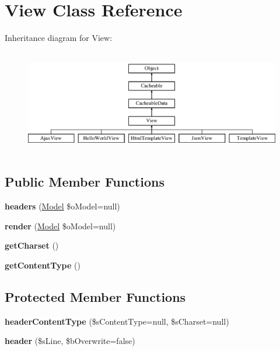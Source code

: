 \hypertarget{class_view}{\section{View Class Reference}
\label{class_view}
}
Inheritance diagram for View\-:\begin{figure}[H]
\begin{center}
\leavevmode
\includegraphics[height=4.590164cm]{class_view}
\end{center}
\end{figure}
\subsection*{Public Member Functions}
\begin{DoxyCompactItemize}
\item 
\hypertarget{class_view_aaa3234016633650917fc337f8becf604}{{\bfseries headers} (\hyperlink{class_model}{Model} \$o\-Model=null)}\label{class_view_aaa3234016633650917fc337f8becf604}

\item 
\hypertarget{class_view_a0d4ea80258b22d65d7438bbe3bd83b73}{{\bfseries render} (\hyperlink{class_model}{Model} \$o\-Model=null)}\label{class_view_a0d4ea80258b22d65d7438bbe3bd83b73}

\item 
\hypertarget{class_view_a2caf1723e7cd9863eaa22a4b3ef2efe3}{{\bfseries get\-Charset} ()}\label{class_view_a2caf1723e7cd9863eaa22a4b3ef2efe3}

\item 
\hypertarget{class_view_ab3d90dd36d7c939b697a3dcf1961ca5c}{{\bfseries get\-Content\-Type} ()}\label{class_view_ab3d90dd36d7c939b697a3dcf1961ca5c}

\end{DoxyCompactItemize}
\subsection*{Protected Member Functions}
\begin{DoxyCompactItemize}
\item 
\hypertarget{class_view_ad7926cf5f6627abdb4eced89b6b113ce}{{\bfseries header\-Content\-Type} (\$s\-Content\-Type=null, \$s\-Charset=null)}\label{class_view_ad7926cf5f6627abdb4eced89b6b113ce}

\item 
\hypertarget{class_view_a3ac0f3711acbb8e3430981119fbec928}{{\bfseries header} (\$s\-Line, \$b\-Overwrite=false)}\label{class_view_a3ac0f3711acbb8e3430981119fbec928}

\end{DoxyCompactItemize}
